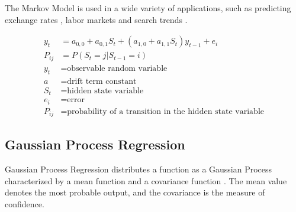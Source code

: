 The Markov Model is used in a wide variety of applications,
such as predicting exchange rates \cite{engel_can_1994}, 
labor markets \cite{krolzig_a_2002} and search trends \cite{bergamaschi_a_2011}.

\begin{align}
	y_t &=a_{0,0} + a_{0,1} S_t + (a_{1,0}+a_{1,1} S_t) y_{t-1} +e_i \\
	P_{ij}&=P(S_t=j | S_{t-1} = i) \\
	y_t &= \mbox{observable random variable} \\
	a &= \mbox{drift term constant} \\
	S_t &= \mbox{hidden state variable} \\ 
	e_i &= \mbox{error} \\
	P_{ij} &= \mbox{probability of a transition in the hidden state variable}  
\end{align}


\subsection{Gaussian Process Regression}
Gaussian Process Regression distributes a function as a Gaussian Process
characterized by a mean function and a covariance function \cite{melo_gaussian_2012}.
The mean value denotes the most probable output, and the covariance is the measure
of confidence. 



